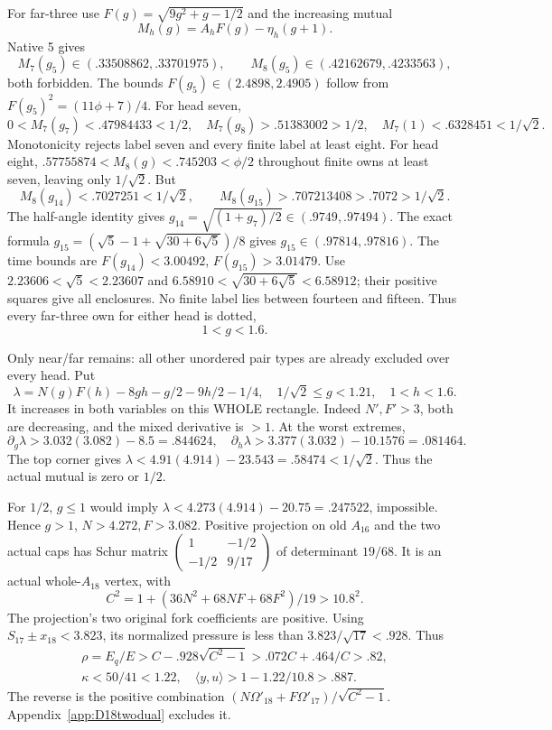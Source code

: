\documentclass[11pt]{article}
\theoremstyle{definition}
\theoremstyle{remark}
\newcommand{\ip}[2]{\langle #1,#2\rangle}
\begin{document}
For far-three use \(F(g)=\sqrt{9g^2+g-1/2}\) and the increasing
mutual
\[
                 M_h(g)=A_hF(g)-\eta_h(g+1).
\]
Native 5 gives
\[
 M_7(g_5)\in(.33508862,.33701975),\qquad
 M_8(g_5)\in(.42162679,.4233563),
\]
both forbidden.
The bounds \(F(g_5)\in(2.4898,2.4905)\) follow from
\(F(g_5)^2=(11\phi+7)/4\).
For head seven,
\[
 0<M_7(g_7)<.47984433<1/2,\quad
 M_7(g_8)>.51383002>1/2,\quad
 M_7(1)<.6328451<1/\sqrt2 .
\]
Monotonicity rejects label seven and every finite label at least eight.
For head eight,
\(.57755874<M_8(g)<.745203<\phi/2\) throughout finite
owns at least seven, leaving only \(1/\sqrt2\).
But
\[
 M_8(g_{14})<.7027251<1/\sqrt2,\qquad
 M_8(g_{15})>.707213408>.7072>1/\sqrt2 .
\]
The half-angle identity gives \(g_{14}=\sqrt{(1+g_7)/2}
\in(.9749,.97494)\).
The exact formula
\(g_{15}=(\sqrt5-1+\sqrt{30+6\sqrt5})/8\)
gives \(g_{15}\in(.97814,.97816)\).
The time bounds are \(F(g_{14})<3.00492\),
\(F(g_{15})>3.01479\).
Use \(2.23606<\sqrt5<2.23607\) and
\(6.58910<\sqrt{30+6\sqrt5}<6.58912\);
their positive squares give all enclosures.
No finite label lies between fourteen and fifteen.
Thus every far-three own for either head is dotted,
\[
                              1<g<1.6 .
\]

Only near/far remains: all other unordered pair types are already
excluded over every head.
Put
\[
 \lambda=N(g)F(h)-8gh-g/2-9h/2-1/4,\quad
 1/\sqrt2\le g<1.21,\quad1<h<1.6 .
\]
It increases in both variables on this WHOLE rectangle.
Indeed \(N',F'>3\), both are decreasing, and the mixed
derivative is \(>1\).
At the worst extremes,
\[
 \partial_g\lambda>3.032(3.082)-8.5=.844624,\quad
 \partial_h\lambda>3.377(3.032)-10.1576=.081464 .
\]
The top corner gives
\(\lambda<4.91(4.914)-23.543=.58474<1/\sqrt2\).
Thus the actual mutual is zero or \(1/2\).

For \(1/2\), \(g\le1\) would imply
\(\lambda<4.273(4.914)-20.75=.247522\), impossible.
Hence \(g>1\), \(N>4.272,F>3.082\).
Positive projection on old \(A_{16}\) and the two actual caps
has Schur matrix
\(\left(\begin{smallmatrix}1&-1/2\\-1/2&9/17\end{smallmatrix}\right)\)
of determinant \(19/68\).
It is an actual whole-\(A_{18}\) vertex, with
\[
 C^2=1+(36N^2+68NF+68F^2)/19>10.8^2.
\]
The projection's two original fork coefficients are positive.
Using \(S_{17}\pm x_{18}<3.823\), its normalized pressure is
less than \(3.823/\sqrt{17}<.928\).
Thus
\[
\begin{gathered}
 \rho=E_q/E>C-.928\sqrt{C^2-1}>.072C+.464/C>.82,\\
 \kappa<50/41<1.22,\quad\ip yu>1-1.22/10.8>.887 .
\end{gathered}
\]
The reverse is the positive combination
\((N\Omega'_{18}+F\Omega'_{17})/\sqrt{C^2-1}\).
Appendix~\ref{app:D18twodual} excludes it.
\end{document}
